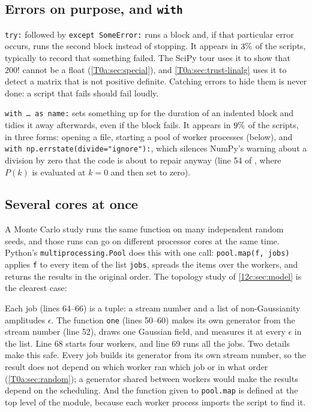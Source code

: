\subsection{Errors on purpose, and \texttt{with}}
\label{T0a:sec:try-with}

\texttt{try:} followed by \texttt{except SomeError:} runs a block and, if that particular error occurs, runs the second block instead of stopping. It appears in $3\%$ of the scripts, typically to record that something failed. The SciPy tour uses it to show that $200!$ cannot be a float (\cref{T0a:sec:special}), and \cref{T0a:sec:trust-linalg} uses it to detect a matrix that is not positive definite. Catching errors to hide them is never done: a script that fails should fail loudly.

\texttt{with \dots{} as name:} sets something up for the duration of an indented block and tidies it away afterwards, even if the block fails. It appears in $9\%$ of the scripts, in three forms: opening a file, starting a pool of worker processes (below), and \texttt{with np.errstate(divide="ignore"):}, which silences NumPy's warning about a division by zero that the code is about to repair anyway (line 54 of , where $P(k)$ is evaluated at $k=0$ and then set to zero).

\subsection{Several cores at once}
\label{T0a:sec:pool}

A Monte Carlo study runs the same function on many independent random seeds, and those runs can go on different processor cores at the same time. Python's \texttt{multiprocessing.Pool} does this with one call: \texttt{pool.map(f, jobs)} applies \texttt{f} to every item of the list \texttt{jobs}, spreads the items over the workers, and returns the results in the original order. The topology study of \cref{12c:sec:model} is the clearest case:


Each job (lines 64--66) is a tuple: a stream number and a list of non-Gaussianity amplitudes $\epsilon$. The function \texttt{one} (lines 50--60) makes its own generator from the stream number (line 52), draws one Gaussian field, and measures it at every $\epsilon$ in the list. Line 68 starts four workers, and line 69 runs all the jobs. Two details make this safe. Every job builds its generator from its own stream number, so the result does not depend on which worker ran which job or in what order (\cref{T0a:sec:random}); a generator shared between workers would make the results depend on the scheduling. And the function given to \texttt{pool.map} is defined at the top level of the module, because each worker process imports the script to find it.

